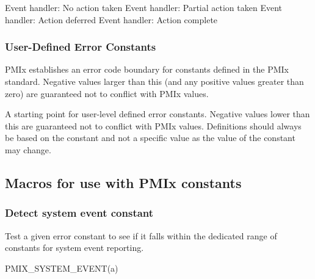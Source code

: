 \begin{constantdesc}
%
Event handler: No action taken
%
Event handler: Partial action taken
%
Event handler: Action deferred
%
Event handler: Action complete
%
\end{constantdesc}

\subsubsection{User-Defined Error Constants}

PMIx establishes an error code boundary for constants defined in the PMIx standard. Negative values larger than this (and any positive values greater than zero) are guaranteed not to conflict with PMIx values.

\begin{constantdesc}
%
A starting point for user-level defined error constants.
Negative values lower than this are guaranteed not to conflict with PMIx values.
Definitions should always be based on the  constant and not a specific value as the value of the constant may change.
%
\end{constantdesc}

\subsection{Macros for use with PMIx constants}

\subsubsection{Detect system event constant}

Test a given error constant to see if it falls within the dedicated range of constants for system event reporting.

\cspecificstart
\begin{codepar}
PMIX_SYSTEM_EVENT(a)
\end{codepar}
\cspecificend

\begin{arglist}
\end{arglist}

